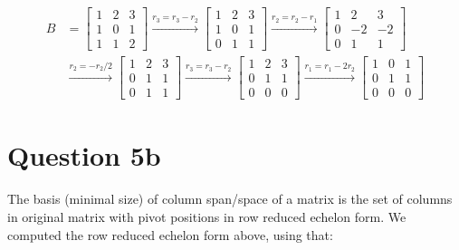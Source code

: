 \documentclass{article}
\begin{document}
    \begin{align*}
        B   &= \begin{bmatrix}
                1 & 2 & 3 \\
                1 & 0 & 1 \\
                1 & 1 & 2
                \end{bmatrix}
            \xrightarrow{r_3 = r_3 - r_2}
            \begin{bmatrix}
                1 & 2 & 3 \\
                1 & 0 & 1 \\
                0 & 1 & 1
            \end{bmatrix}
            \xrightarrow{r_2 = r_2 - r_1}
            \begin{bmatrix}
                1 & 2 & 3 \\
                0 & -2 & -2 \\
                0 & 1 & 1
            \end{bmatrix} \\
            &\xrightarrow{r_2 = -r_2/2}
            \begin{bmatrix}
                1 & 2 & 3 \\
                0 & 1 & 1 \\
                0 & 1 & 1
            \end{bmatrix}
            \xrightarrow{r_3 = r_3 - r_2}
            \begin{bmatrix}
                1 & 2 & 3 \\
                0 & 1 & 1 \\
                0 & 0 & 0
            \end{bmatrix}
            \xrightarrow{r_1 = r_1 - 2r_2}
            \begin{bmatrix}
                1 & 0 & 1 \\
                0 & 1 & 1 \\
                0 & 0 & 0
            \end{bmatrix}
    \end{align*}

    \section*{Question 5b}
    The basis (minimal size) of column span/space of a matrix is the set of columns in original matrix with pivot positions in row reduced echelon form. We computed the row reduced echelon form above, using that:
\end{document}
